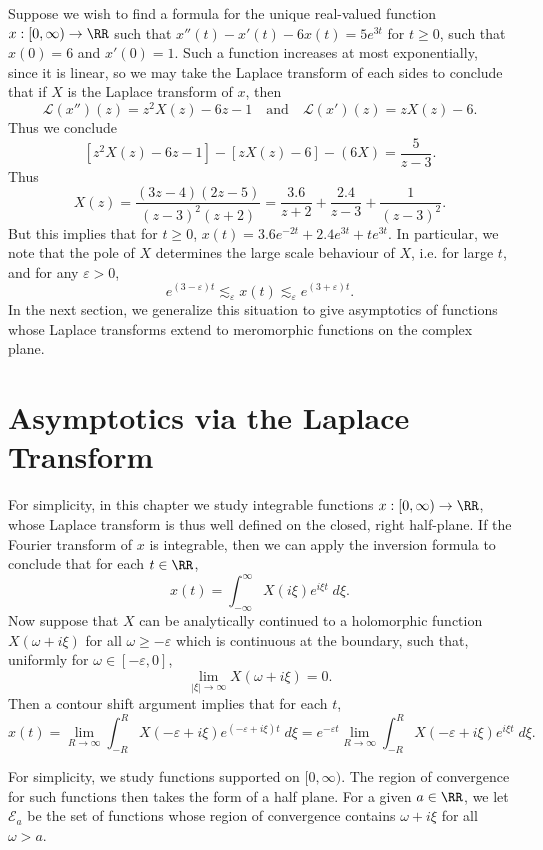 \begin{example}
    Suppose we wish to find a formula for the unique real-valued function $x: [0,\infty) \to \RR$ such that $x''(t) - x'(t) - 6x(t) = 5e^{3t}$ for $t \geq 0$, such that $x(0) = 6$ and $x'(0) = 1$. Such a function increases at most exponentially, since it is linear, so we may take the Laplace transform of each sides to conclude that if $X$ is the Laplace transform of $x$, then
    \[ \mathcal{L}(x'')(z) = z^2 X(z) - 6z - 1 \quad\text{and}\quad \mathcal{L}(x')(z) = z X(z) - 6. \]
    Thus we conclude
    \[ [z^2 X(z) - 6z - 1] - [zX(z) - 6] - (6X) = \frac{5}{z - 3}. \]
    Thus
    \[ X(z) = \frac{(3z - 4)(2z - 5)}{(z - 3)^2(z+2)} = \frac{3.6}{z + 2} + \frac{2.4}{z - 3} + \frac{1}{(z - 3)^2}. \]
    But this implies that for $t \geq 0$, $x(t) = 3.6 e^{-2t} + 2.4 e^{3t} + te^{3t}$. In particular, we note that the pole of $X$ determines the large scale behaviour of $X$, i.e. for large $t$, and for any $\varepsilon > 0$,
    \[ e^{(3 - \varepsilon)t} \lesssim_\varepsilon x(t) \lesssim_\varepsilon e^{(3 + \varepsilon)t}. \]
    In the next section, we generalize this situation to give asymptotics of functions whose Laplace transforms extend to meromorphic functions on the complex plane.
\end{example}

\section{Asymptotics via the Laplace Transform}

For simplicity, in this chapter we study integrable functions $x: [0,\infty) \to \RR$, whose Laplace transform is thus well defined on the closed, right half-plane. If the Fourier transform of $x$ is integrable, then we can apply the inversion formula to conclude that for each $t \in \RR$,
%
\[ x(t) = \int_{-\infty}^\infty X(i\xi) e^{i \xi t}\; d\xi. \]
%
Now suppose that $X$ can be analytically continued to a holomorphic function $X(\omega + i\xi)$ for all $\omega \geq -\varepsilon$ which is continuous at the boundary, such that, uniformly for $\omega \in [-\varepsilon,0]$,
%
\[ \lim_{|\xi| \to \infty} X(\omega + i\xi) = 0. \]
%
Then a contour shift argument implies that for each $t$,
%
\[ x(t) = \lim_{R \to \infty} \int_{-R}^R X(-\varepsilon + i\xi) e^{(-\varepsilon + i\xi) t}\; d\xi = e^{-\varepsilon t} \lim_{R \to \infty} \int_{-R}^R X(-\varepsilon + i\xi) e^{i \xi t}\; d\xi. \]

For simplicity, we study functions supported on $[0,\infty)$. The region of convergence for such functions then takes the form of a half plane. For a given $a \in \RR$, we let $\mathcal{E}_a$ be the set of functions whose region of convergence contains $\omega + i\xi$ for all $\omega > a$.


